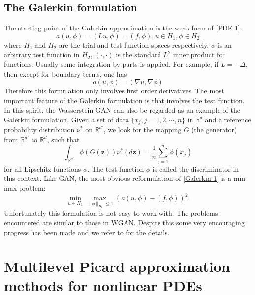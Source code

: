 \documentclass[12pt,AutoFakeBold,AutoFakeSlant]{article}
\theoremstyle{definition}
\newcommand{\R}{\mathbb{R}}
\newcommand{\bx}{{x}}
\newcommand{\bz}{\bm{z}}
\newcommand{\be}{\begin{equation}}
\newcommand{\ee}{\end{equation}}
\begin{document}
	\subsection{The Galerkin formulation}
	The starting point of the Galerkin approximation is the weak form of 
	\eqref{PDE-1}:
	\be
	a(u, \phi)  =  (Lu, \phi) = (f, \phi), u \in H_1, \phi \in H_2
	\label{Galerkin-1}
	\ee
	where $H_1$ and $H_2$ are the trial and test function spaces respectively,
	$\phi$ is an arbitrary test function in $H_2$, 
	$(\cdot, \cdot) $ is the standard $L^2$ inner product for functions. 
	Usually some integration by parts is applied.  For example, if $L = - \Delta$, then
	except for boundary terms, one has
	\be
	a(u, \phi) = (\nabla u, \nabla \phi) 
	\ee
	Therefore this formulation only involves first order derivatives.
	The most important feature of the Galerkin formulation is that involves
	the test function.
	In this spirit, the Wasserstein GAN can also be regarded as an example of the
	Galerkin formulation. Given a set of data $\{\bx_j, j=1, 2, \cdots ,n\}$ in
	$\R^d$ and a reference probability distribution $\nu^*$ on $\R^{d'}$,
	we look for the mapping $G$ (the generator) from $\R^{d'}$ to $\R^d$,
	such that \cite{arjovsky2017wgan}
	\be
	\int_{\R^{d'}} \phi(G(\bz)) \nu^*(d \bz) = \frac 1n \sum_{j=1}^n \phi(\bx_j)
	\label{WGAN}
	\ee
	for all Lipschitz functions $\phi$. The test function $\phi$ is called the discriminator
	in this context.
	Like GAN, the most obvious reformulation of \eqref{Galerkin-1} is a min-max problem:
	\be
	\min_{u \in H_1} \max_{\|\phi\|_{H_2} \le 1} (a(u, \phi) - (f, \phi))^2.
	\label{Galerkin-2}
	\ee
	Unfortunately this formulation is not easy to work with.
	The problems encountered are similar to those in WGAN. 
	Despite this some very encouraging progress has been made and we
	refer to \cite{Zang2020weak} for the details.


	\section{Multilevel Picard approximation methods for nonlinear PDEs}
	\label{sec:MLP}
\end{document}
